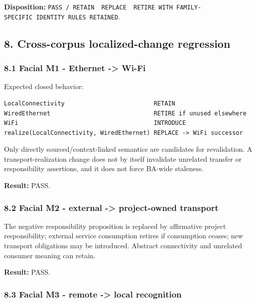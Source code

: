 \documentclass[11pt,a4paper]{article}
\begin{document}
\textbf{Disposition:} \texttt{PASS\ /\ RETAIN\ \textbar{}\ REPLACE\ \textbar{}\ RETIRE\ WITH\ FAMILY-SPECIFIC\ IDENTITY\ RULES\ RETAINED}.

\subsection{8. Cross-corpus localized-change regression}\label{cross-corpus-localized-change-regression}

\subsubsection{8.1 Facial M1 - Ethernet -\textgreater{} Wi-Fi}\label{facial-m1---ethernet---wi-fi}

Expected closed behavior:

\begin{verbatim}
LocalConnectivity                         RETAIN
WiredEthernet                             RETIRE if unused elsewhere
WiFi                                      INTRODUCE
realize(LocalConnectivity, WiredEthernet) REPLACE -> WiFi successor
\end{verbatim}

Only directly sourced/context-linked semantics are candidates for revalidation. A transport-realization change does not by itself invalidate unrelated transfer or responsibility assertions, and it does not force BA-wide staleness.

\textbf{Result:} PASS.

\subsubsection{8.2 Facial M2 - external -\textgreater{} project-owned transport}\label{facial-m2---external---project-owned-transport}

The negative responsibility proposition is replaced by affirmative project responsibility; external service consumption retires if consumption ceases; new transport obligations may be introduced. Abstract connectivity and unrelated consumer meaning can retain.

\textbf{Result:} PASS.

\subsubsection{8.3 Facial M3 - remote -\textgreater{} local recognition}\label{facial-m3---remote---local-recognition}
\end{document}
